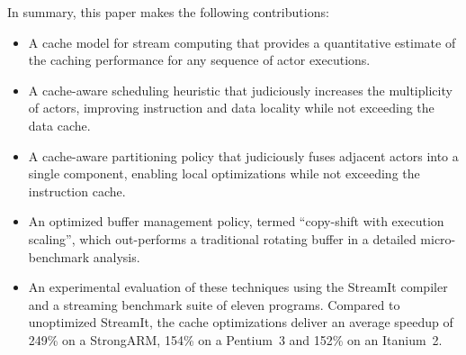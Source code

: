 In summary, this paper makes the following contributions:
\begin{itemize}

\item A cache model for stream computing that provides a quantitative
estimate of the caching performance for any sequence of actor
executions.

\item A cache-aware scheduling heuristic that judiciously increases
the multiplicity of actors, improving instruction and data locality
while not exceeding the data cache.

\item A cache-aware partitioning policy that judiciously fuses
adjacent actors into a single component, enabling local optimizations
while not exceeding the instruction cache.

\item An optimized buffer management policy, termed ``copy-shift with
execution scaling'', which out-performs a traditional rotating buffer
in a detailed micro-benchmark analysis.

\item An experimental evaluation of these techniques using the
StreamIt compiler and a streaming benchmark suite of eleven programs.
Compared to unoptimized StreamIt, the cache optimizations deliver an
average speedup of 249\% on a StrongARM, 154\% on a Pentium~3 and
152\% on an Itanium~2.

\end{itemize}





